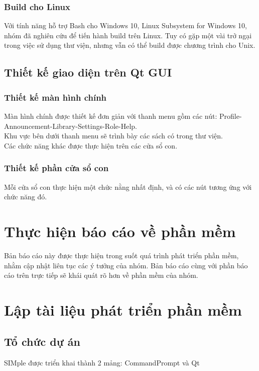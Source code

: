 \documentclass[12pt,a4paper]{report}
\begin{document}
            \subsubsection{Build cho Linux}

            Với tính năng hỗ trợ Bash cho Windows 10, Linux Subsystem for Windows 10, nhóm đã nghiên cứu để tiến hành build trên Linux. Tuy có gặp một vài trở ngại trong việc sử dụng thư viện, nhưng vẫn có thể build được chương trình cho Unix.
        \subsection{Thiết kế giao diện trên Qt GUI}
            \subsubsection{Thiết kế màn hình chính}
            Màn hình chính được thiết kế đơn giản với thanh menu gồm các nút: Profile-Announcement-Library-Settings-Role-Help.\\
            Khu vực bên dưới thanh menu sẽ trình bày các sách có trong thư viện.\\
            Các chức năng khác được thực hiện trên các cửa sổ con.\\
            \subsubsection{Thiết kế phần cửa sổ con}
            Mỗi cửa sổ con thực hiện một chức nằng nhất định, và có các nút tương ứng với chức năng đó.\\
    \section{Thực hiện báo cáo về phần mềm}
        Bản báo cáo này được thực hiện trong suốt quá trình phát triển phần mềm, nhằm cập nhật liên tục các ý tưởng của nhóm. Bản báo cáo cùng với phần báo cáo trên trực tiếp sẽ khái quát rõ hơn về phần mềm của nhóm.
    \section{Lập tài liệu phát triển phần mềm}
        \subsection{Tổ chức dự án}
        SIMple được triển khai thành 2 mảng: CommandPrompt và Qt
\end{document}
